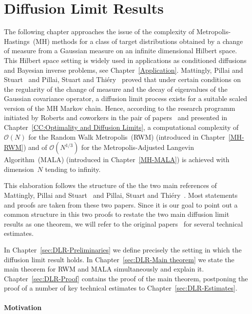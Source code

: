 \chapter{Diffusion Limit Results}
\label{Diffusion Limit Results}

The following chapter approaches the issue of the complexity of Metropolis-Hastings~(MH) methods for a class of target distributions obtained by a change of measure from a Gaussian measure on an infinite dimensional Hilbert space. This Hilbert space setting is widely used in applications as conditioned diffusions and Bayesian inverse problems, see Chapter~\ref{Application}. Mattingly, Pillai and Stuart~\autocite{Mattingly2010} and Pillai, Stuart and Thi\'{e}ry~\autocite{Pillai2012} proved that under certain conditions on the regularity of the change of measure and the decay of eigenvalues of the Gaussian covariance operator, a diffusion limit process exists for a suitable scaled version of the MH Markov chain. Hence, according to the research programm initiated by Roberts and coworkers in the pair of papers~\autocite{Roberts1997, Roberts1998} and presented in Chapter~\ref{CC:Optimality and Diffusion Limits}, a computational complexity of $\mathcal{O}(N)$ for the Random Walk Metropolis~(RWM) (introduced in Chapter~\ref{MH-RWM}) and of $\mathcal{O}(N^{1/3})$ for the Metropolis-Adjusted Langevin Algorithm~(MALA) (introduced in Chapter~\ref{MH-MALA}) is achieved with dimension~$N$ tending to infinity.

This elaboration follows the structure of the the two main references of Mattingly, Pillai and Stuart~\autocite{Mattingly2010} and Pillai, Stuart and Thi\'{e}ry~\autocite{Pillai2012}. Most statements and proofs are taken from these two papers. Since it is our goal to point out a common structure in this two proofs to restate the two main diffusion limit results as one theorem, we will refer to the original papers~\autocite{Mattingly2010, Pillai2012} for several technical estimates.

In Chapter~\ref{sec:DLR-Preliminaries} we define precisely the setting in which the diffusion limit result holds. In Chapter~\ref{sec:DLR-Main theorem} we state the main theorem for RWM and MALA simultaneously and explain it. Chapter~\ref{sec:DLR-Proof} contains the proof of the main theorem, postponing the proof of a number of key technical estimates to Chapter~\ref{sec:DLR-Estimates}.


\subsubsection{Motivation}

